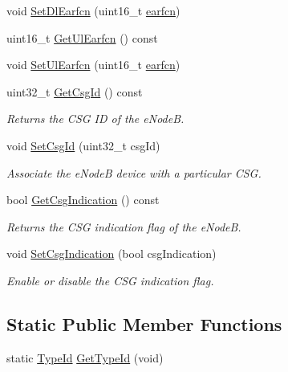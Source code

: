 \begin{DoxyCompactItemize}
\item 
void \hyperlink{classns3_1_1LteEnbNetDevice_adcffee7ba0ed8e271e50d84b33bc2e0d}{Set\+Dl\+Earfcn} (uint16\+\_\+t \hyperlink{generate__test__data__lte__spectrum__value__txpsd_8m_a584be7562abb392609629331f8c6c42c}{earfcn})
\item 
uint16\+\_\+t \hyperlink{classns3_1_1LteEnbNetDevice_a01fab0a675cfcca89e53753fd2dd662e}{Get\+Ul\+Earfcn} () const 
\item 
void \hyperlink{classns3_1_1LteEnbNetDevice_a3a686c09e2694c959884706ac4540c82}{Set\+Ul\+Earfcn} (uint16\+\_\+t \hyperlink{generate__test__data__lte__spectrum__value__txpsd_8m_a584be7562abb392609629331f8c6c42c}{earfcn})
\item 
uint32\+\_\+t \hyperlink{classns3_1_1LteEnbNetDevice_ab8d476d8421065acb947d4d037503d00}{Get\+Csg\+Id} () const 
\begin{DoxyCompactList}\small\item\em Returns the C\+SG ID of the e\+NodeB. \end{DoxyCompactList}\item 
void \hyperlink{classns3_1_1LteEnbNetDevice_a3295d645fda58a79bddd1a48270119f0}{Set\+Csg\+Id} (uint32\+\_\+t csg\+Id)
\begin{DoxyCompactList}\small\item\em Associate the e\+NodeB device with a particular C\+SG. \end{DoxyCompactList}\item 
bool \hyperlink{classns3_1_1LteEnbNetDevice_aa42650897c28880352cd8f65f305b0b0}{Get\+Csg\+Indication} () const 
\begin{DoxyCompactList}\small\item\em Returns the C\+SG indication flag of the e\+NodeB. \end{DoxyCompactList}\item 
void \hyperlink{classns3_1_1LteEnbNetDevice_a8151f16ad371bd4c2276d99ef80c6f5d}{Set\+Csg\+Indication} (bool csg\+Indication)
\begin{DoxyCompactList}\small\item\em Enable or disable the C\+SG indication flag. \end{DoxyCompactList}\end{DoxyCompactItemize}
\subsection*{Static Public Member Functions}
\begin{DoxyCompactItemize}
\item 
static \hyperlink{classns3_1_1TypeId}{Type\+Id} \hyperlink{classns3_1_1LteEnbNetDevice_a5a17444284da7566eadfc242ba013371}{Get\+Type\+Id} (void)
\end{DoxyCompactItemize}
